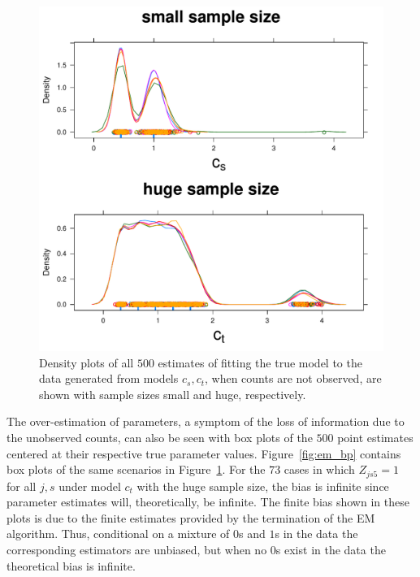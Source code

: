 \begin{figure}
  \centering
  \includegraphics[scale=0.5]{em}
  \caption{Density plots of all $500$ estimates of fitting the true model to the data generated from models $c_s,c_t$, when counts are not observed, are shown with sample sizes small and huge, respectively.}
  \label{fig:em}
\end{figure}

The over-estimation of parameters, a symptom of the loss of information due to the unobserved counts, can also be seen with box plots of the $500$ point estimates centered at their respective true parameter values.  Figure~\ref{fig:em_bp} contains box plots of the same scenarios in Figure~\ref{fig:em}.  For the $73$ cases in which $Z_{js5} = 1$ for all $j,s$ under model $c_t$ with the huge sample size, the bias is infinite since parameter estimates will, theoretically, be infinite.  The finite bias shown in these plots is due to the finite estimates provided by the termination of the EM algorithm.  Thus, conditional on a mixture of $0$s and $1$s in the data the corresponding estimators are unbiased, but when no $0$s exist in the data the theoretical bias is infinite.  

